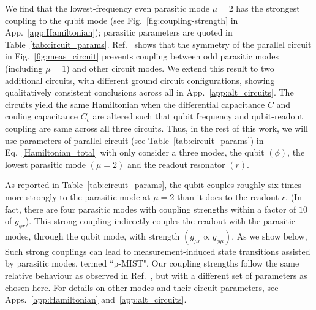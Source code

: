 \documentclass[prx,showpacs,notitlepage,twocolumn,superscriptaddress,nofootinbib,preprintnumbers,floatfix]{revtex4-2}
\newcommand{\ER}[1]{{\color{purple}{{}[ER: #1]}}}
\begin{document}
 We find that the lowest-frequency even parasitic mode $\mu=2$ has the strongest coupling to the qubit mode (see Fig.~\ref{fig:coupling-strength} in App.~\ref{app:Hamiltonian}); parasitic parameters are quoted in Table~\ref{tab:circuit_params}. Ref.~\cite{viola2015collective} shows that the symmetry of the parallel circuit in Fig.~\ref{fig:meas_circuit} prevents coupling between odd parasitic modes (including $\mu=1$) and other circuit modes. We extend this result to two additional circuits, with different ground circuit configurations, showing qualitatively consistent conclusions across all in App.~\ref{app:alt_circuits}. The circuits yield the same Hamiltonian when the differential capacitance $C$ and couling capacitance $C_c$ are altered such that qubit frequency and qubit-readout coupling are same across all three circuits. Thus, in the rest of this work, we will use parameters of parallel circuit (see Table~\ref{tab:circuit_params}) in Eq.~\ref{Hamiltonian_total} with only consider a three modes, the qubit $(\phi)$, the lowest parasitic mode $(\mu=2)$ and the readout resonator $(r)$. 
 
As reported in Table~\ref{tab:circuit_params}, the qubit couples roughly six times more strongly to the parasitic mode at $\mu=2$ than it does to the readout $r$. (In fact, there are four parasitic modes with coupling strengths within a factor of $10$ of $g_{\phi r}$). This strong coupling indirectly couples the readout with the parasitic modes, through the qubit mode, with strength $(g_{\mu r}\propto g_{\phi\mu})$. As we show below, Such strong couplings can lead to measurement-induced state transitions assisted by parasitic modes, termed ``p-MIST". %
Our coupling strengths follow the same relative behaviour as observed in Ref.~\cite{viola2015collective}, but with a different set of parameters as chosen here. For details on other modes and their circuit parameters, see Apps.~\ref{app:Hamiltonian} and~\ref{app:alt_circuits}. 

\end{document}
